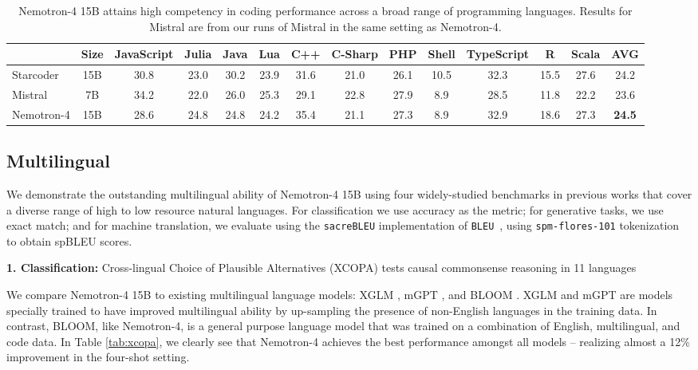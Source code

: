 \documentclass[11pt]{article}
\newcommand{\ours}{Nemotron-4}
\begin{document}
\begin{table}[t]
\centering
\begin{adjustbox}{max width=\textwidth, scale=1.0}
\begin{tabular}{lccccccccccccc}
\toprule
  & Size & JavaScript & Julia & Java & Lua & C++ & C-Sharp & PHP & Shell & TypeScript & R & Scala & AVG  \\
\midrule
Starcoder & 15B & 30.8 & 23.0 & 30.2 & 23.9 & 31.6 & 21.0 & 26.1	& 10.5 & 32.3 & 15.5 & 27.6 & 24.2 \\
Mistral & 7B & 34.2 & 22.0 & 26.0 & 25.3 & 29.1 & 22.8 & 27.9	& 8.9 & 28.5 & 11.8 & 22.2 & 23.6 \\
\ours{} & 15B & 28.6 & 24.8 & 24.8 & 24.2 & 35.4 & 21.1 & 27.3 & 8.9 & 32.9 & 18.6 & 27.3 & \textbf{24.5} \\ 
\bottomrule
\end{tabular}
\end{adjustbox}
\caption{\label{tab:multiple-e} \ours{} 15B attains high competency in coding performance across a broad range of programming languages. Results for Mistral are from our runs of Mistral in the same setting as \ours{}. }
\end{table}

\subsection{Multilingual}

We demonstrate the outstanding multilingual ability of \ours{} 15B using four widely-studied benchmarks in previous works that cover a diverse range of high to low resource natural languages. For classification we use accuracy as the metric; for generative tasks, we use exact match; and for machine translation, we evaluate using the \texttt{sacreBLEU} \citep{post2018} implementation of \texttt{BLEU}~\citep{papineni2002}, using \texttt{spm-flores-101} tokenization to obtain spBLEU scores. 

\textbf{1. Classification:}  Cross-lingual Choice of Plausible Alternatives (XCOPA) \citep{xcopa} tests causal commonsense reasoning in 11 languages 

We compare \ours{} 15B to existing multilingual language models: XGLM \citep{lin2022fewshot} , mGPT \citep{shliazhko2022mgpt}, and BLOOM \citep{workshop2023bloom}. 
XGLM and mGPT are models specially trained to have improved multilingual ability by up-sampling the presence of non-English languages in the training data. 
In contrast, BLOOM, like \ours{}, is a general purpose language model that was trained on a combination of English, multilingual, and code data. 
In Table \ref{tab:xcopa}, we clearly see that \ours{} achieves the best performance amongst all models -- realizing almost a 12\% improvement in the four-shot setting. 
\end{document}

